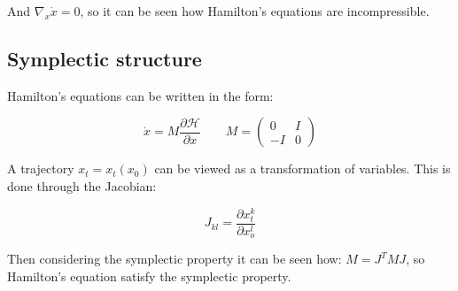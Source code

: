 	And $\nabla_x\dot{x} = 0$, so it can be seen how Hamilton's equations are incompressible.

	\subsection{Symplectic structure}
	Hamilton's equations can be written in the form:

	$$\dot{x} = M\frac{\partial\mathcal{H}}{\partial x}\qquad M = \begin{pmatrix} 0 & I\\ -I & 0\end{pmatrix}$$

	A trajectory $x_t = x_t(x_0)$ can be viewed as a transformation of variables.
	This is done through the Jacobian:

	$$J_{kl} = \frac{\partial x_t^k}{\partial x_o^l}$$

	Then considering the symplectic property it can be seen how: $M = J^TMJ$, so Hamilton's equation satisfy the symplectic property.
